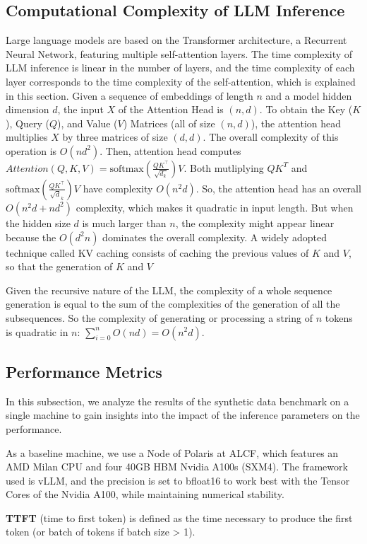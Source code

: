 \documentclass[conference]{IEEEtran}
\begin{document}
\subsection{Computational Complexity of LLM Inference}
Large language models are based on the Transformer architecture, a Recurrent Neural Network, featuring multiple self-attention layers.
The time complexity of LLM inference is linear in the number of layers, and the time complexity of each layer corresponds to the time complexity of the self-attention, which is explained in this section.
Given a sequence of embeddings of length $n$ and a model hidden dimension $d$, the input $X$ of the Attention Head is $(n,d)$. To obtain the Key ($K$), Query ($Q$), and Value ($V$) Matrices (all of size $(n,d)$), the attention head multiplies $X$ by three matrices of size $(d,d)$. The overall complexity of this operation is $O(nd^2)$. Then, attention head computes $Attention(Q,K,V)=\text{softmax}(\frac{QK^⊤}{\sqrt{d_k}})V$. Both mutliplying $QK^T$ and $\text{softmax}(\frac{QK^⊤}{\sqrt d_k})V$ have complexity $O(n^2d)$. So, the attention head has an overall $O(n^2d+nd^2)$ complexity, which makes it quadratic in input length. But when the hidden size $d$ is much larger than $n$, the complexity might appear linear because the $O(d^2n)$ dominates the overall complexity.
A widely adopted technique called KV caching consists of caching the previous values of $K$ and $V$, so that the generation of $K$ and $V$

Given the recursive nature of the LLM, the complexity of a whole sequence generation is equal to the sum of the complexities of the generation of all the subsequences. So the complexity of generating or processing a string of $n$ tokens is quadratic in $n$: $\sum_{i=0}^nO(nd)=O(n^2d)$.

\subsection{Performance Metrics}
In this subsection, we analyze the results of the synthetic data benchmark on a single machine to gain insights into the impact of the inference parameters on the performance.

As a baseline machine, we use a Node of Polaris at ALCF, which features an AMD Milan CPU and four 40GB HBM Nvidia A100s (SXM4). The framework used is vLLM, and the precision is set to bfloat16 to work best with the Tensor Cores of the Nvidia A100, while maintaining numerical stability.

\textbf{TTFT} (time to first token) is defined as the time necessary to produce the first token (or batch of tokens if batch size > 1).
\end{document}
